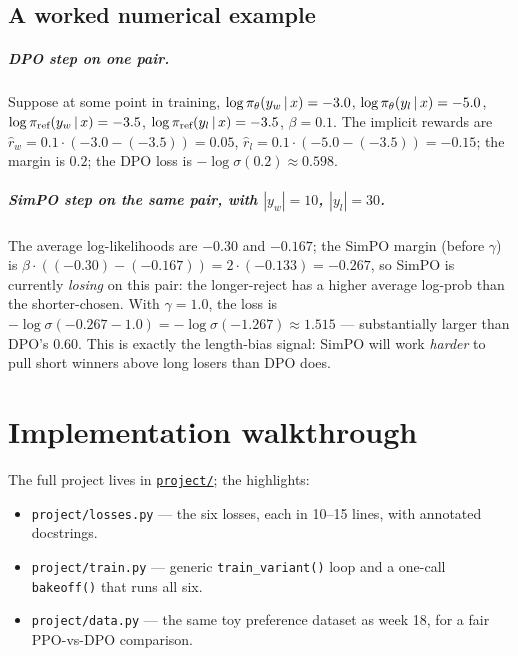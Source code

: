 \documentclass[11pt,oneside]{scrbook}
\begin{document}
\section{A worked numerical example}

\paragraph{DPO step on one pair.}
Suppose at some point in training,
$\log\pi_\theta(y_w \,\vert\, x) = -3.0$, $\log\pi_\theta(y_l \,\vert\, x) = -5.0$,
$\log\pi_{\text{ref}}(y_w \,\vert\, x) = -3.5$, $\log\pi_{\text{ref}}(y_l \,\vert\, x) = -3.5$,
$\beta = 0.1$.
The implicit rewards are
$\hat r_w = 0.1 \cdot (-3.0 - (-3.5)) = 0.05$,
$\hat r_l = 0.1 \cdot (-5.0 - (-3.5)) = -0.15$;
the margin is $0.2$;
the DPO loss is $-\log\sigma(0.2) \approx 0.598$.

\paragraph{SimPO step on the same pair, with $|y_w| = 10$,
$|y_l| = 30$.} The average log-likelihoods are
$-0.30$ and $-0.167$; the SimPO margin (before $\gamma$) is
$\beta \cdot ((-0.30) - (-0.167)) = 2 \cdot (-0.133) = -0.267$, so
SimPO is currently \emph{losing} on this pair: the longer-reject has a
higher average log-prob than the shorter-chosen. With $\gamma = 1.0$,
the loss is $-\log\sigma(-0.267 - 1.0) = -\log\sigma(-1.267) \approx 1.515$
--- substantially larger than DPO's $0.60$.
This is exactly the length-bias signal: SimPO will work \emph{harder}
to pull short winners above long losers than DPO does.

\chapter{Implementation walkthrough}

The full project lives in
\href{run:./project/}{\texttt{project/}}; the highlights:

\begin{itemize}
  \item \texttt{project/losses.py} --- the six losses, each in 10--15
        lines, with annotated docstrings.
  \item \texttt{project/train.py} --- generic
        \texttt{train\_variant()} loop and a one-call
        \texttt{bakeoff()} that runs all six.
  \item \texttt{project/data.py} --- the same toy preference dataset
        as week 18, for a fair PPO-vs-DPO comparison.
\end{itemize}
\end{document}
